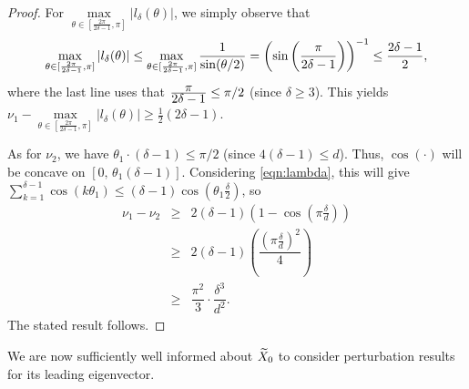 \begin{proof}
For $\max\limits_{\theta \in [\frac{2\pi}{2\delta-1}, \pi]} |l_\delta(\theta)|$, we simply observe that \[\max\limits_{\theta \in [\frac{2\pi}{2\delta-1}, \pi]} |l_\delta(\theta)| \le \max\limits_{\theta \in [\frac{2\pi}{2\delta-1}, \pi]} \dfrac{1}{\sin(\theta / 2)} = \left( \sin \left(\frac{\pi}{2\delta - 1} \right) \right)^{-1}  \le \frac{\displaystyle 2\delta - 1}{\displaystyle 2},\] where the last line uses that $\frac{\displaystyle \pi}{\displaystyle 2\delta - 1} \le \pi / 2$ (since $\delta \ge 3$).  This yields $\nu_1 - \max\limits_{\theta \in [\frac{2\pi}{2\delta-1}, \pi]} |l_\delta(\theta)| \ge \frac{1}{2}(2 \delta - 1)$.

As for $\nu_2$, we have $\theta_1 \cdot (\delta - 1) \le \pi / 2$ (since $4(\delta - 1) \le d$). Thus, $\cos(\cdot)$ will be concave on $[0,\, \theta_1(\delta-1)]$.  Considering \eqref{eqn:lambda}, this will give $\sum_{k=1}^{\delta - 1}\cos(k\theta_1) \le (\delta - 1) \cos \left(\theta_1 \frac{\delta}{2} \right)$, so \[\begin{array}{rcl}
  \nu_1 - \nu_2 & \ge & 2(\delta - 1) \left(1 - \cos \left(\pi\frac{\delta}{d} \right) \right)\\
  & \ge & 2(\delta - 1) \left(\dfrac{(\pi \frac{\delta}{d})^2}{4}\right) \\
  & \ge & \dfrac{\pi^2}{3} \cdot \dfrac{\delta^3}{d^2}.
\end{array}\]
The stated result follows.  %
\end{proof}

We are now sufficiently well informed about $\widetilde{X}_0$ to consider perturbation results for its leading eigenvector.
